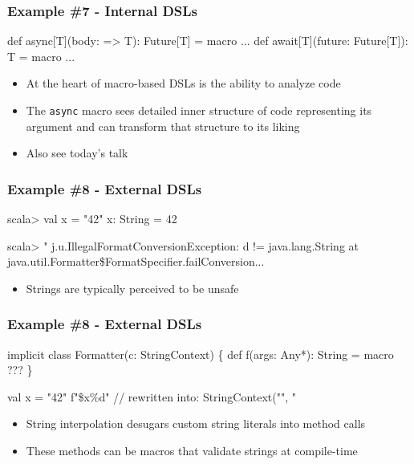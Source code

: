 \documentclass[svgnames,hyperref={bookmarks=false}]{beamer}
\begin{document}
\begin{frame}[fragile]
\frametitle{Example \#7 - Internal DSLs}

\begin{semiverbatim}
\alert{def async[T](body: => T): Future[T] = macro ...}
\alert{def await[T](future: Future[T]): T = macro ...}

\end{semiverbatim}

\begin{itemize}
\item At the heart of macro-based DSLs is the ability to analyze code
\item The \texttt{async} macro sees detailed inner structure of code representing its argument and can transform that structure to its liking
\item Also see today's talk 
\end{itemize}
\end{frame}

\begin{frame}[fragile]
\frametitle{Example \#8 - External DSLs}

\begin{semiverbatim}
scala> val x = "42"
x: String = 42

scala> "%
j.u.IllegalFormatConversionException: d != java.lang.String
  at java.util.Formatter\$FormatSpecifier.failConversion...
\end{semiverbatim}

\begin{itemize}
\item Strings are typically perceived to be unsafe
\end{itemize}
\end{frame}

\begin{frame}[fragile]
\frametitle{Example \#8 - External DSLs}

\begin{semiverbatim}
implicit class Formatter(c: StringContext) \{
  \alert{def f(args: Any*): String = macro ???}
\}

val x = "42"
\alert{f"}\$x\%d\alert{"} // rewritten into: StringContext("", "%

\end{semiverbatim}

\begin{itemize}
\item String interpolation desugars custom string literals into method calls
\item These methods can be macros that validate strings at compile-time
\end{itemize}
\end{frame}
\end{document}

